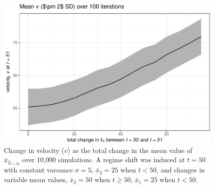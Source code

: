 \documentclass[12pt,twoside,openany]{reedthesis}
\begin{document}
\begin{figure}
\centering
\includegraphics{_myDissertation_files/figure-latex/simVplot2-1.pdf}
\caption{\label{fig:simVplot2}Change in velocity (\(v\)) as the total change in the mean value of \(\bar{x}_{2_{t=50}}\) over 10,000 simulations. A regime shift was induced at \(t=50\) with constant varoance \(\sigma = 5\), \(\bar{x}_2 = 25\) when \(t<50\), and changes in variable mean values, \(\bar{x}_2 = 50\) when \(t \geq 50\), \(\bar{x}_1 = 25\) when \(t<50\).}
\end{figure}
\end{document}
